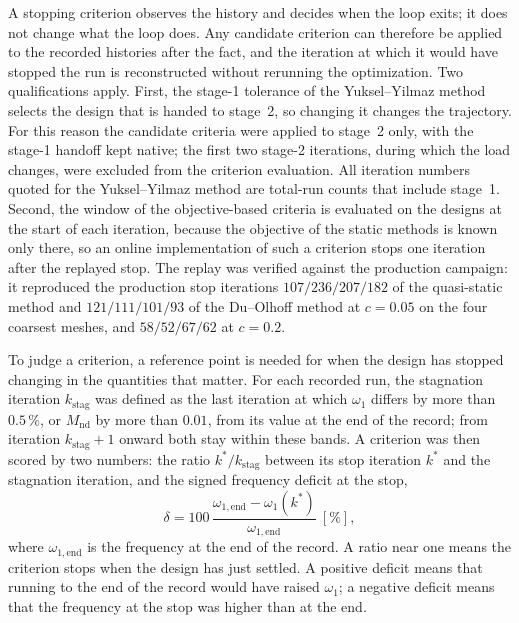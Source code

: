 \documentclass[11pt,a4paper]{article}
\newcommand{\Mnd}{M_{\mathrm{nd}}}
\newcommand{\kstag}{k_{\mathrm{stag}}}
\begin{document}
A stopping criterion observes the history and decides when the loop exits; it does not change what the loop does. Any candidate criterion can therefore be applied to the recorded histories after the fact, and the iteration at which it would have stopped the run is reconstructed without rerunning the optimization. Two qualifications apply. First, the stage-1 tolerance of the Yuksel--Yilmaz method selects the design that is handed to stage~2, so changing it changes the trajectory. For this reason the candidate criteria were applied to stage~2 only, with the stage-1 handoff kept native; the first two stage-2 iterations, during which the load changes, were excluded from the criterion evaluation. All iteration numbers quoted for the Yuksel--Yilmaz method are total-run counts that include stage~1. Second, the window of the objective-based criteria is evaluated on the designs at the start of each iteration, because the objective of the static methods is known only there, so an online implementation of such a criterion stops one iteration after the replayed stop. The replay was verified against the production campaign: it reproduced the production stop iterations $107/236/207/182$ of the quasi-static method and $121/111/101/93$ of the Du--Olhoff method at $c = 0.05$ on the four coarsest meshes, and $58/52/67/62$ at $c = 0.2$.

To judge a criterion, a reference point is needed for when the design has stopped changing in the quantities that matter. For each recorded run, the stagnation iteration $\kstag$ was defined as the last iteration at which $\omega_1$ differs by more than $0.5\,\%$, or $\Mnd$ by more than $0.01$, from its value at the end of the record; from iteration $\kstag + 1$ onward both stay within these bands. A criterion was then scored by two numbers: the ratio $k^*/\kstag$ between its stop iteration $k^*$ and the stagnation iteration, and the signed frequency deficit at the stop,
\begin{equation}
\label{eq:deficit}
\delta = 100\,\frac{\omega_{1,\mathrm{end}} - \omega_1(k^*)}{\omega_{1,\mathrm{end}}}\ [\%],
\end{equation}
where $\omega_{1,\mathrm{end}}$ is the frequency at the end of the record. A ratio near one means the criterion stops when the design has just settled. A positive deficit means that running to the end of the record would have raised $\omega_1$; a negative deficit means that the frequency at the stop was higher than at the end.
\end{document}
